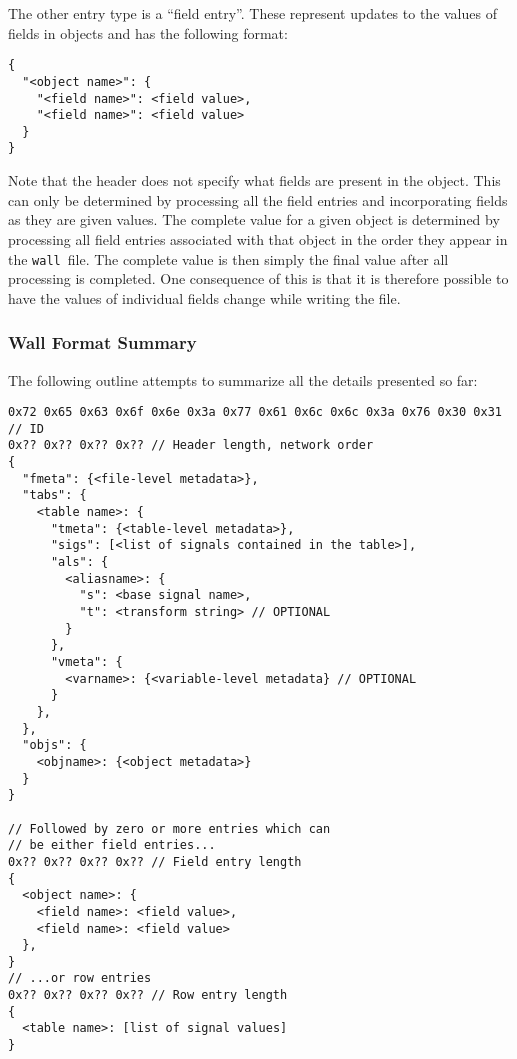 \documentclass[11pt,a4paper,onecolumn]{article}
\newcommand{\wall}{\texttt{wall}}
\begin{document}
The other entry type is a ``field entry''.  These represent updates to
the values of fields in objects and has the following format:

\begin{verbatim}
{
  "<object name>": {
    "<field name>": <field value>,
    "<field name>": <field value>
  }
}
\end{verbatim}

Note that the header does not specify what fields are present in the
object.  This can only be determined by processing all the field
entries and incorporating fields as they are given values.  The
complete value for a given object is determined by processing all
field entries associated with that object in the order they appear in
the \wall\ file.  The complete value is then simply the final value
after all processing is completed.  One consequence of this is that it
is therefore possible to have the values of individual fields change
while writing the file.

\subsubsection{Wall Format Summary}


The following outline attempts to summarize all the details presented so
far:

\begin{verbatim}
0x72 0x65 0x63 0x6f 0x6e 0x3a 0x77 0x61 0x6c 0x6c 0x3a 0x76 0x30 0x31 // ID
0x?? 0x?? 0x?? 0x?? // Header length, network order
{
  "fmeta": {<file-level metadata>},
  "tabs": {
    <table name>: {
      "tmeta": {<table-level metadata>},
      "sigs": [<list of signals contained in the table>],
      "als": {
        <aliasname>: {
          "s": <base signal name>,
          "t": <transform string> // OPTIONAL
        }
      },
      "vmeta": {
        <varname>: {<variable-level metadata} // OPTIONAL
      }
    },
  },
  "objs": {
    <objname>: {<object metadata>}
  }
}

// Followed by zero or more entries which can
// be either field entries...
0x?? 0x?? 0x?? 0x?? // Field entry length
{
  <object name>: {
    <field name>: <field value>,
    <field name>: <field value>
  },
}
// ...or row entries
0x?? 0x?? 0x?? 0x?? // Row entry length
{
  <table name>: [list of signal values]  
}
\end{verbatim}
\end{document}

